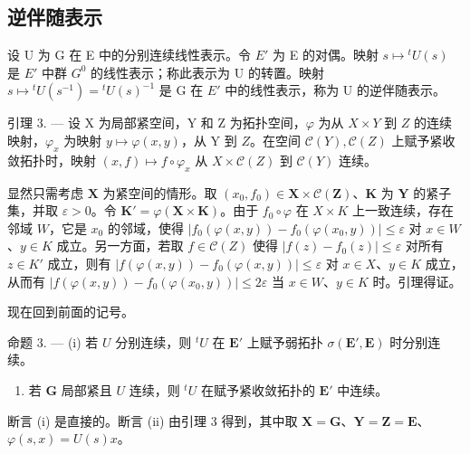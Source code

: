 \subsection{逆伴随表示}

设 U 为 G 在 E 中的分别连续线性表示。令 \(E'\) 为 E 的对偶。映射 \(s \mapsto {}^{t}U(s)\) 是 \(E'\) 中群 \(G^{0}\) 的线性表示；称此表示为 U 的转置。映射 \(s \mapsto {}^{t}U(s^{-1}) = {}^{t}U(s)^{-1}\) 是 G 在 \(E'\) 中的线性表示，称为 U 的逆伴随表示。

引理 3. --- 设 X 为局部紧空间，Y 和 Z 为拓扑空间，\(\varphi\) 为从 \(X \times Y\) 到 \(Z\) 的连续映射，\(\varphi_x\) 为映射 \(y \mapsto \varphi(x, y)\)，从 Y 到 \(Z\)。在空间 \(\mathcal{C}(Y), \mathcal{C}(Z)\) 上赋予紧收敛拓扑时，映射 \((x, f) \mapsto f \circ \varphi_x\) 从 \(X \times \mathcal{C}(Z)\) 到 \(\mathcal{C}(Y)\) 连续。

显然只需考虑 \(\mathbf{X}\) 为紧空间的情形。取 \((x_0, f_0) \in \mathbf{X} \times \mathcal{C}(\mathbf{Z})\)、\(\mathbf{K}\) 为 \(\mathbf{Y}\) 的紧子集，并取 \(\varepsilon > 0\)。令 \(\mathbf{K}' = \varphi(\mathbf{X} \times \mathbf{K})\)。由于 \(f_0 \circ \varphi\) 在 \(X \times K\) 上一致连续，存在邻域 \(W\)，它是 \(x_0\) 的邻域，使得 \(|f_0(\varphi(x, y)) - f_0(\varphi(x_0, y))| \leqslant \varepsilon\) 对 \(x \in W\)、\(y \in K\) 成立。另一方面，若取 \(f \in \mathcal{C}(Z)\) 使得 \(|f(z) - f_0(z)| \leqslant \varepsilon\) 对所有 \(z \in K'\) 成立，则有 \(|f(\varphi(x, y)) - f_0(\varphi(x, y))| \leqslant \varepsilon\) 对 \(x \in X\)、\(y \in K\) 成立，从而有 \(|f(\varphi(x, y)) - f_0(\varphi(x_0, y))| \leqslant 2\varepsilon\) 当 \(x \in W\)、\(y \in K\) 时。引理得证。

现在回到前面的记号。

命题 3. --- (i) 若 \(U\) 分别连续，则 \({}^t U\) 在 \(\mathbf{E}'\) 上赋予弱拓扑 \(\sigma(\mathbf{E}',\mathbf{E})\) 时分别连续。

\begin{enumerate}
\def\labelenumi{(\roman{enumi})}
\setcounter{enumi}{1}
\tightlist
\item
  若 \(\mathbf{G}\) 局部紧且 \(U\) 连续，则 \({}^t U\) 在赋予紧收敛拓扑的 \(\mathbf{E}'\) 中连续。
\end{enumerate}

断言 (i) 是直接的。断言 (ii) 由引理 3 得到，其中取 \(\mathbf{X} = \mathbf{G}\)、\(\mathbf{Y} = \mathbf{Z} = \mathbf{E}\)、\(\varphi(s, x) = U(s)x\)。

